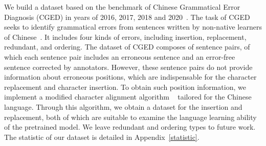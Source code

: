 \documentclass[11pt]{article}
\begin{document}
We build a dataset based on the benchmark of Chinese Grammatical Error Diagnosis (CGED) in years of 2016, 2017, 2018 and 2020~\cite{lee-etal-2016-overview,rao-etal-2017-ijcnlp,rao-etal-2018-overview,rao-etal-2020-overview}. The task of CGED seeks to identify grammatical errors from sentences written by non-native learners of Chinese~\cite{Yu14}.
It includes four kinds of errors, including insertion, replacement, redundant, and ordering. The dataset of CGED composes of sentence pairs, of which each sentence pair includes an erroneous sentence and an error-free sentence corrected by annotators. However, these sentence pairs do not provide information about erroneous positions, which are indispensable for the character replacement and character insertion. To obtain such position information, we implement a modified character alignment algorithm
~\cite{bryant2017automatic} tailored for the Chinese language. Through this algorithm, 
we obtain a dataset for the insertion and replacement, both of which are suitable to examine the language learning ability of the pretrained model. 
We leave redundant and ordering types to future work.  
The statistic of our dataset is detailed in Appendix~\ref{statistic}.
\end{document}
